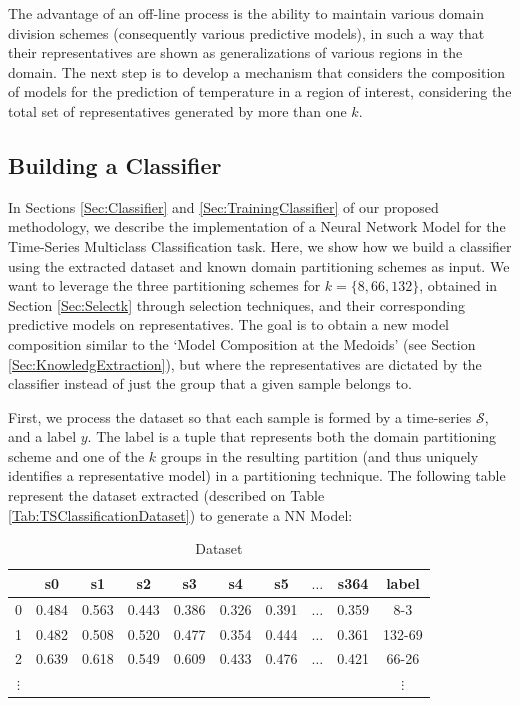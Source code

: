 The advantage of an off-line process is the ability to maintain various domain division schemes (consequently various predictive models), in such a way that their representatives are shown as generalizations of various regions in the domain. The next step is to develop a mechanism that considers the composition of models for the prediction of temperature in a region of interest, considering the total set of representatives generated by more than one $k$. 

\subsection{Building a Classifier}
\label{Sec:ExperimentsTrainingClassifier}

In Sections \ref{Sec:Classifier} and \ref{Sec:TrainingClassifier} of our proposed methodology, we describe the implementation of a Neural Network Model for the Time-Series Multiclass Classification task. Here, we show how we build a classifier using the extracted dataset and known domain partitioning schemes as input. We want to leverage the three partitioning schemes for $k = \{8, 66, 132\}$, obtained in Section \ref{Sec:Selectk} through selection techniques, and their corresponding predictive models on representatives. The goal is to obtain a new model composition similar to the `Model Composition at the Medoids' (see Section \ref{Sec:KnowledgExtraction}), but where the representatives are dictated by the classifier instead of just the group that a given sample belongs to. 

First, we process the dataset so that each sample is formed by a time-series $\mathcal{S}$, and a label $y$. The label is a tuple that represents both the domain partitioning scheme and one of the $k$ groups in the resulting partition (and thus uniquely identifies a representative model) in a partitioning technique.  %
The following table represent the dataset extracted (described on Table \ref{Tab:TSClassificationDataset}) to generate a NN Model:

\begin{table}[h]
	\centering
	\small
	\begin{tabular}[h]{|c|c|c|c|c|c|c|c|c|c|}
		\hline
		  & s0    & s1    & s2    & s3    & s4    &	s5    & $\ldots$ & s364  &   label \\ \hline
		0 & 0.484 & 0.563 & 0.443 & 0.386 & 0.326 &	0.391 & $\ldots$ & 0.359 &   8-3 \\
		1 &	0.482 &	0.508 &	0.520 &	0.477 &	0.354 &	0.444 & $\ldots$ & 0.361 & 132-69 \\
		2 &	0.639 & 0.618 &	0.549 &	0.609 &	0.433 & 0.476 & $\ldots$ & 0.421 &	66-26 \\ 
		$\vdots$  & &     &       &       &       &       &          &       & $\vdots$ \\ \hline
	\end{tabular}
	\caption{Dataset }
	\label{Table:DatasetTSC}
\end{table}

